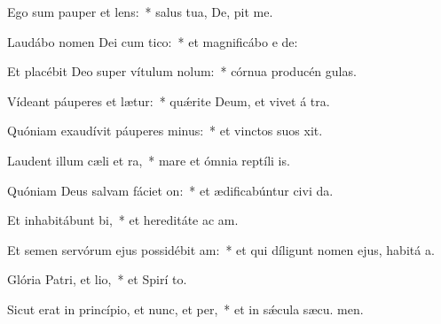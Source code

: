 \item Ego sum pauper et lens:~* salus tua, De, pit me.
\item Laudábo nomen Dei cum tico:~* et magnificábo e  de:
\item Et placébit Deo super vítulum nolum:~* córnua producén  gulas.
\item Vídeant páuperes et lætur:~* quǽrite Deum, et vivet á tra.
\item Quóniam exaudívit páuperes minus:~* et vinctos suos  xit.
\item Laudent illum cæli et ra,~* mare et ómnia reptíli  is.
\item Quóniam Deus salvam fáciet on:~* et ædificabúntur civi da.
\item Et inhabitábunt bi,~* et hereditáte ac am.
\item Et semen servórum ejus possidébit am:~* et qui díligunt nomen ejus, habitá  a.
\item Glória Patri, et lio,~* et Spirí to.
\item Sicut erat in princípio, et nunc, et per,~* et in sǽcula sæcu. men.
